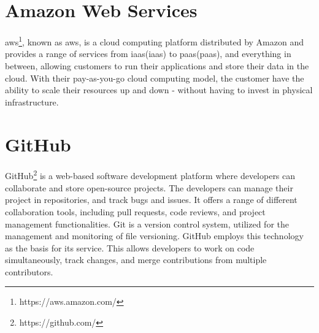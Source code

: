 \section{Amazon Web Services}
\acrlong{aws}\footnote{https://aws.amazon.com/}, known as \acrshort{aws}, is a cloud computing platform distributed by Amazon and provides a range of services from \acrlong{iaas}(\acrshort{iaas}) to \acrlong{paas}(\acrshort{paas}), and everything in between, allowing customers to run their applications and store their data in the cloud. With their pay-as-you-go cloud computing model, the customer have the ability to scale their resources up and down - without having to invest in physical infrastructure.\cite{aws}  

\section{GitHub}
GitHub\footnote{https://github.com/} is a web-based software development platform where developers can collaborate and store open-source projects. The developers can manage their project in repositories, and track bugs and issues. It offers a range of different collaboration tools, including pull requests, code reviews, and project management functionalities. Git is a version control system, utilized for the management and monitoring of file versioning. GitHub employs this technology as the basis for its service. This allows developers to work on code simultaneously, track changes, and merge contributions from multiple contributors.\cite{github}
